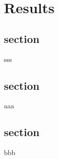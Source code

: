 \chapter{Results}
\label{chapter:results}
\section{section}
sss
\newpage
\section{section}
aaa
\newpage
\section{section}
bbb
\cite{gelo}
\noindent\lipsum[15-20]
